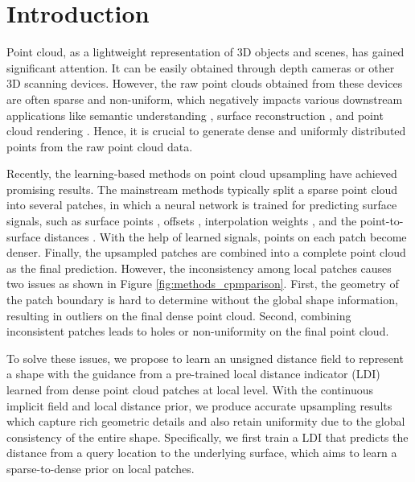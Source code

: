 \documentclass[letterpaper]{article} %
\begin{document}
\section{Introduction}
Point cloud, as a lightweight representation of 3D objects and scenes, has gained significant attention. It can be easily obtained through depth cameras or other 3D scanning devices. However, the raw point clouds obtained from these devices are often sparse and non-uniform, which negatively impacts various downstream applications like semantic understanding \cite{zhang2019review}, surface reconstruction \cite{chen2023unsupervised}, and point cloud rendering \cite{dai2020neural}. Hence, it is crucial to generate dense and uniformly distributed points from the raw point cloud data.


Recently, the learning-based methods on point cloud upsampling have achieved promising results. The mainstream methods typically split a sparse point cloud into several patches, in which a neural network is trained for predicting surface signals, such as surface points \cite{yu2018pu, li2019pu, qian2021pu, feng2022neural}, offsets \cite{li2021point}, interpolation weights \cite{luo2021pu, qian2021deep}, and the point-to-surface distances \cite{he2023grad, zhao2023self}. With the help of learned signals, points on each patch become denser. Finally, the upsampled patches are combined into a complete point cloud as the final prediction. However, the inconsistency among local patches causes two issues as shown in Figure \ref{fig:methods_cpmparison}. First, the geometry of the patch boundary is hard to determine without the global shape information, resulting in outliers on the final dense point cloud. Second, combining inconsistent patches leads to holes or non-uniformity on the final point cloud.


To solve these issues, we propose to learn an unsigned distance field to represent a shape with the guidance from a pre-trained local distance indicator (LDI) learned from dense point cloud patches at local level. With the continuous implicit field and local distance prior, we produce accurate upsampling results which capture rich geometric details and also retain uniformity due to the global consistency of the entire shape. Specifically, we first train a LDI that predicts the distance from a query location to the underlying surface, which aims to learn a sparse-to-dense prior on local patches.
\end{document}
